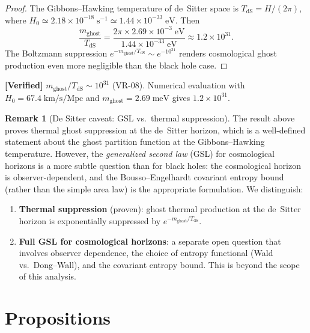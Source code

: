 \documentclass[11pt,a4paper]{article}
\newcommand{\mghost}{m_{\mathrm{ghost}}}
\theoremstyle{plain}
\theoremstyle{definition}
\newtheorem{remark}[theorem]{Remark}
\newcommand{\verified}[1]{%
  \par\smallskip\noindent
  \colorbox{green!10}{\parbox{\dimexpr\linewidth-2\fboxsep}{%
    \textcolor{green!50!black}{\textbf{[Verified]}} #1}}%
  \par\smallskip}
\begin{document}
\begin{proof}
  The Gibbons--Hawking temperature of de~Sitter space is
  $T_{\mathrm{dS}} = H/(2\pi)$, where
  $H_0 \simeq 2.18\times 10^{-18}\;\mathrm{s}^{-1}
  \simeq 1.44\times 10^{-33}\;\mathrm{eV}$.  Then
  \[
    \frac{\mghost}{T_{\mathrm{dS}}}
    = \frac{2\pi\times 2.69\times 10^{-3}\;\mathrm{eV}}
           {1.44\times 10^{-33}\;\mathrm{eV}}
    \approx 1.2\times 10^{31}.
  \]
  The Boltzmann suppression $e^{-\mghost/T_{\mathrm{dS}}}
  \sim e^{-10^{31}}$ renders cosmological ghost production even more
  negligible than the black hole case.
\end{proof}

\verified{$\mghost/T_{\mathrm{dS}} \sim 10^{31}$ (VR-08).  Numerical
evaluation with $H_0 = 67.4\;\mathrm{km/s/Mpc}$ and
$\mghost = 2.69\;\mathrm{meV}$ gives $1.2\times 10^{31}$.}

\begin{remark}[De Sitter caveat: GSL vs.\ thermal suppression]%
\label{rem:ds_gsl}
  The result above proves thermal ghost suppression at the de~Sitter
  horizon, which is a well-defined statement about the ghost partition
  function at the Gibbons--Hawking temperature.  However, the
  \emph{generalized second law} (GSL) for cosmological horizons is a
  more subtle question than for black holes: the cosmological horizon
  is observer-dependent, and the Bousso--Engelhardt covariant entropy
  bound (rather than the simple area law) is the appropriate
  formulation.  We distinguish:
  \begin{enumerate}[label=(\alph*)]
    \item \textbf{Thermal suppression} (proven): ghost thermal
      production at the de~Sitter horizon is exponentially suppressed
      by $e^{-\mghost/T_{\mathrm{dS}}}$.
    \item \textbf{Full GSL for cosmological horizons}: a separate open
      question that involves observer dependence, the choice of
      entropy functional (Wald vs.\ Dong--Wall), and the covariant
      entropy bound.  This is beyond the scope of this analysis.
  \end{enumerate}
\end{remark}


\section{Propositions}\label{sec:propositions}
\end{document}
